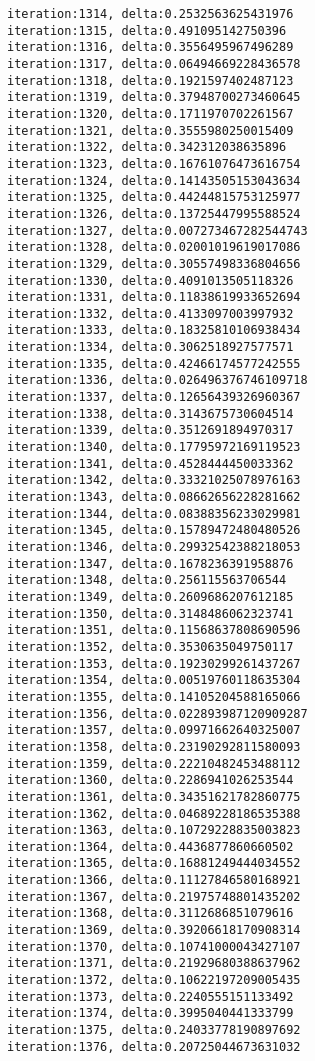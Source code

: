 \documentclass[11pt]{article}
\begin{document}
\begin{Verbatim}[commandchars=\\\{\}]
iteration:1314, delta:0.2532563625431976
iteration:1315, delta:0.491095142750396
iteration:1316, delta:0.3556495967496289
iteration:1317, delta:0.06494669228436578
iteration:1318, delta:0.1921597402487123
iteration:1319, delta:0.37948700273460645
iteration:1320, delta:0.1711970702261567
iteration:1321, delta:0.3555980250015409
iteration:1322, delta:0.342312038635896
iteration:1323, delta:0.16761076473616754
iteration:1324, delta:0.14143505153043634
iteration:1325, delta:0.44244815753125977
iteration:1326, delta:0.13725447995588524
iteration:1327, delta:0.007273467282544743
iteration:1328, delta:0.02001019619017086
iteration:1329, delta:0.30557498336804656
iteration:1330, delta:0.4091013505118326
iteration:1331, delta:0.11838619933652694
iteration:1332, delta:0.4133097003997932
iteration:1333, delta:0.18325810106938434
iteration:1334, delta:0.3062518927577571
iteration:1335, delta:0.42466174577242555
iteration:1336, delta:0.026496376746109718
iteration:1337, delta:0.12656439326960367
iteration:1338, delta:0.3143675730604514
iteration:1339, delta:0.3512691894970317
iteration:1340, delta:0.17795972169119523
iteration:1341, delta:0.4528444450033362
iteration:1342, delta:0.33321025078976163
iteration:1343, delta:0.08662656228281662
iteration:1344, delta:0.08388356233029981
iteration:1345, delta:0.15789472480480526
iteration:1346, delta:0.29932542388218053
iteration:1347, delta:0.1678236391958876
iteration:1348, delta:0.256115563706544
iteration:1349, delta:0.2609686207612185
iteration:1350, delta:0.3148486062323741
iteration:1351, delta:0.11568637808690596
iteration:1352, delta:0.3530635049750117
iteration:1353, delta:0.19230299261437267
iteration:1354, delta:0.00519760118635304
iteration:1355, delta:0.14105204588165066
iteration:1356, delta:0.022893987120909287
iteration:1357, delta:0.09971662640325007
iteration:1358, delta:0.23190292811580093
iteration:1359, delta:0.22210482453488112
iteration:1360, delta:0.2286941026253544
iteration:1361, delta:0.34351621782860775
iteration:1362, delta:0.04689228186535388
iteration:1363, delta:0.10729228835003823
iteration:1364, delta:0.4436877860660502
iteration:1365, delta:0.16881249444034552
iteration:1366, delta:0.11127846580168921
iteration:1367, delta:0.21975748801435202
iteration:1368, delta:0.3112686851079616
iteration:1369, delta:0.39206618170908314
iteration:1370, delta:0.10741000043427107
iteration:1371, delta:0.21929680388637962
iteration:1372, delta:0.10622197209005435
iteration:1373, delta:0.2240555151133492
iteration:1374, delta:0.3995040441333799
iteration:1375, delta:0.24033778190897692
iteration:1376, delta:0.20725044673631032

\end{Verbatim}
\end{document}
